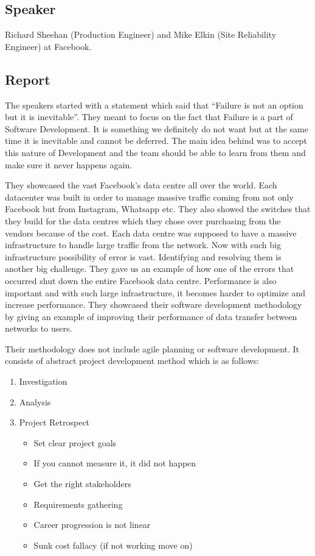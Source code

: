 \subsection{Speaker}

Richard Sheehan (Production Engineer) and Mike Elkin (Site Reliability Engineer) at Facebook.

\subsection{Report}

The speakers started with a statement which said that ``Failure is not an option but it is inevitable''. They meant to focus on the fact that Failure is a part of Software Development. It is something we definitely do not want but at the same time it is inevitable and cannot be deferred. The main idea behind was to accept this nature of Development and the team should be able to learn from them and make sure it never happens again. 

They showcased the vast Facebook's data centre all over the world. Each datacenter was built in order to manage massive traffic coming from not only Facebook but from Instagram, Whatsapp etc. They also showed the switches that they build for the data centres which they chose over purchasing from the vendors because of the cost. Each data centre was supposed to have a massive infrastructure to handle large traffic from the network. Now with such big infrastructure possibility of error is vast. Identifying and resolving them is another big challenge. They gave us an example of how one of the errors that occurred shut down the entire Facebook data centre. Performance is also important and with such large infrastructure, it becomes harder to optimize and increase performance. They showcased their software development methodology by giving an example of improving their performance of data transfer between networks to users.

Their methodology does not include agile planning or software development. It consists of abstract project development method which is as follows:
\begin{enumerate}
      \item Investigation
      \item Analysis
      \item Project Retrospect
      \begin{itemize}
            \item Set clear project goals
            \item If you cannot measure it, it did not happen
            \item Get the right stakeholders
            \item Requirements gathering
            \item Career progression is not linear
            \item Sunk cost fallacy (if not working move on)
      \end{itemize}
\end{enumerate}

